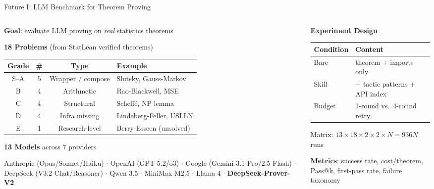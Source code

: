 \documentclass[aspectratio=169, 10pt]{beamer}
\begin{document}
\begin{frame}{Future I: LLM Benchmark for Theorem Proving}

\begin{columns}[T]
\begin{column}{0.54\textwidth}
\textbf{Goal}: evaluate LLM proving on \emph{real} statistics theorems

\vspace{0.3em}
\textbf{18 Problems} (from StatLean verified theorems)

{\scriptsize
\begin{tabular}{cccl}
  \toprule
  \textbf{Grade} & \textbf{\#} & \textbf{Type} & \textbf{Example} \\
  \midrule
  S--A & 5 & Wrapper / compose & Slutsky, Gauss-Markov \\
  B    & 4 & Arithmetic        & Rao-Blackwell, MSE \\
  C    & 4 & Structural        & Scheff\'{e}, NP lemma \\
  D    & 4 & Infra missing     & Lindeberg-Feller, USLLN \\
  E    & 1 & Research-level    & Berry-Esseen (unsolved) \\
  \bottomrule
\end{tabular}
}

\vspace{0.3em}
\textbf{13 Models} across 7 providers

{\scriptsize Anthropic (Opus/Sonnet/Haiku) $\cdot$ OpenAI (GPT-5.2/o3) $\cdot$ Google (Gemini 3.1 Pro/2.5 Flash) $\cdot$ DeepSeek (V3.2 Chat/Reasoner) $\cdot$ Qwen 3.5 $\cdot$ MiniMax M2.5 $\cdot$ Llama 4 $\cdot$ \textbf{DeepSeek-Prover-V2}}
\end{column}
\begin{column}{0.42\textwidth}
\textbf{Experiment Design}

\vspace{0.2em}
{\small
\begin{tabular}{ll}
  \toprule
  \textbf{Condition} & \textbf{Content} \\
  \midrule
  Bare  & theorem + imports only \\
  Skill & + tactic patterns + API index \\
  \midrule
  Budget & 1-round vs.\ 4-round retry \\
  \bottomrule
\end{tabular}
}

{\footnotesize Matrix: $13 \times 18 \times 2 \times 2 \times N = 936N$ runs}

\vspace{0.2em}
\textbf{Metrics}: success rate, cost/theorem, Pass@k, first-pass rate, failure taxonomy
\end{column}
\end{columns}

\end{frame}
\end{document}
